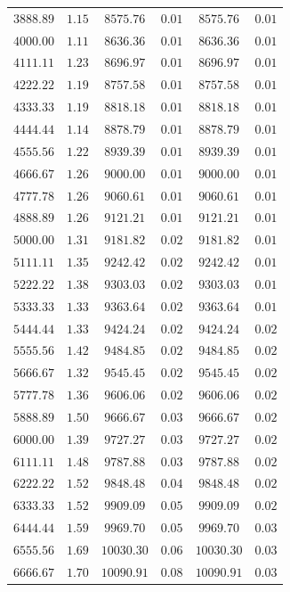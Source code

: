 \documentclass[
	12pt,
	]{article}
\theoremstyle{definition}
\theoremstyle{definition}
\theoremstyle{definition}
\theoremstyle{definition}
\theoremstyle{definition}
\theoremstyle{example}
\theoremstyle{note}
\theoremstyle{remark}
\theoremstyle{example}
\begin{document}
\begin{longtable}{cccccc}
				$3888.89$&	$1.15$&	$8575.76$&	$0.01$&	$8575.76$&	$0.01$\\
				$4000.00$&	$1.11$&	$8636.36$&	$0.01$&	$8636.36$&	$0.01$\\
				$4111.11$&	$1.23$&	$8696.97$&	$0.01$&	$8696.97$&	$0.01$\\
				$4222.22$&	$1.19$&	$8757.58$ & $0.01$&	$8757.58$&	$0.01$\\
				$4333.33$&	$1.19$&	$8818.18$&	$0.01$&	$8818.18$&	$0.01$\\
				$4444.44$&	$1.14$&	$8878.79$&	$0.01$&	$8878.79$&	$0.01$\\
				$4555.56$&	$1.22$&	$8939.39$ &  $0.01$&	$8939.39$&	$0.01$\\
				$4666.67$&	$1.26$&	$9000.00$&	$0.01$&	$9000.00$&	$0.01$\\
				$4777.78$&	$1.26$&	$9060.61$&	$0.01$&	$9060.61$&	$0.01$\\
				$4888.89$&	$1.26$&	$9121.21$ &  $0.01$&	$9121.21$&	$0.01$\\
				$5000.00$&	$1.31$&	$9181.82$&	$0.02$&	$9181.82$&	$0.01$\\
				$5111.11$&	$1.35$&	$9242.42$&	$0.02$&	$9242.42$&	$0.01$\\
				$5222.22$&	$1.38$&	$9303.03$&	$0.02$&	$9303.03$&	$0.01$\\
				$5333.33$&	$1.33$&	$9363.64$&	$0.02$&	$9363.64$&	$0.01$\\
				$5444.44$&	$1.33$&	$9424.24$&	$0.02$&	$9424.24$&	$0.02$\\
				$5555.56$&	$1.42$&	$9484.85$&	$0.02$&	$9484.85$&	$0.02$\\
				$5666.67$&	$1.32$&	$9545.45$&	$0.02$&	$9545.45$&	$0.02$\\
				$5777.78$&	$1.36$&	$9606.06$&	$0.02$&	$9606.06$&	$0.02$\\
				$5888.89$&	$1.50$&	$9666.67$&	$0.03$&	$9666.67$&	$0.02$\\
				$6000.00$&	$1.39$&	$9727.27$&	$0.03$&	$9727.27$&	$0.02$\\
				$6111.11$&	$1.48$&	$9787.88$&	$0.03$&	$9787.88$&	$0.02$\\
				$6222.22$&	$1.52$&	$9848.48$&	$0.04$&	$9848.48$&	$0.02$\\
				$6333.33$&	$1.52$&	$9909.09$&	$0.05$&	$9909.09$&	$0.02$\\
				$6444.44$&	$1.59$&	$9969.70$&	$0.05$&	$9969.70$&	$0.03$\\
				$6555.56$&	$1.69$&	$10030.30$&	$0.06$&	$10030.30$&	$0.03$\\
				$6666.67$&	$1.70$&	$10090.91$&	$0.08$&	$10090.91$&	$0.03$\\

\end{longtable}
\end{document}
